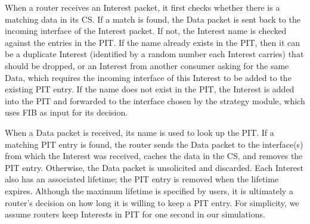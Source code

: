 When a router receives an Interest packet, it first checks whether there is a matching data in its CS.
If a match is found, the Data packet is sent back to the incoming interface of the Interest packet.
If not, the Interest name is checked against the entries in the PIT. 
If the name already exists in the PIT, then it can be a duplicate Interest (identified by a random number each Interest carries) that should be dropped,
or an Interest from another consumer asking for the same Data, which requires the incoming interface of this Interest to be added to the existing PIT entry.
If the name does not exist in the PIT, the Interest is added into the PIT and forwarded to the interface chosen by the strategy module, which uses FIB as input for its decision.

When a Data packet is received, its name is used to look up the PIT.
If a matching PIT entry is found,
the router sends the Data packet to the interface(s) from which the Interest was received, caches the data in the CS, and removes the PIT entry.  Otherwise, the Data packet is unsolicited and discarded. 
Each Interest also has an associated lifetime; the PIT entry is removed when the lifetime expires.
Although the maximum lifetime is specified by users, it is ultimately a router's decision on how long it is willing to keep a PIT entry.  
For simplicity, we assume routers keep Interests in PIT for one second in our simulations.






